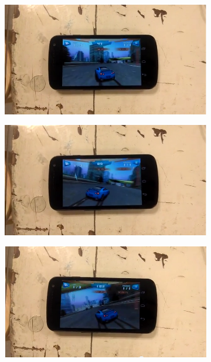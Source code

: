 \begin{figure}[t]

\begin{subfigure}[t]{0.33\textwidth}
\includegraphics[width=\textwidth]{./figures/apps/fast_racing/fastracing1.png}
\caption{}
\end{subfigure}%
\begin{subfigure}[t]{0.33\textwidth}
\includegraphics[width=\textwidth]{./figures/apps/fast_racing/fastracing2.png}
\caption{}
\end{subfigure}%
\begin{subfigure}[t]{0.33\textwidth}
\includegraphics[width=\textwidth]{./figures/apps/fast_racing/fastracing3.png}
\caption{}
\end{subfigure}


\end{figure}
